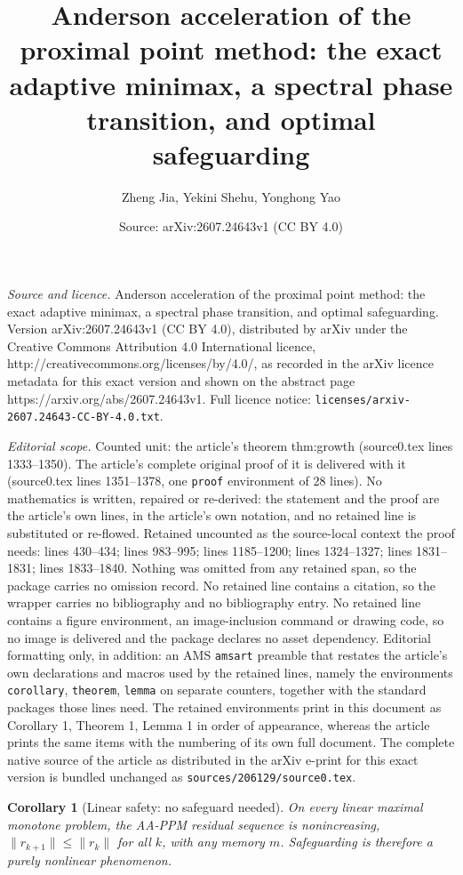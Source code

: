 \documentclass[10pt,a4paper]{amsart}
\title{Anderson acceleration of the proximal point method: the exact adaptive minimax, a spectral phase transition, and optimal safeguarding}
\author{Zheng Jia, Yekini Shehu, Yonghong Yao}
\date{Source: arXiv:2607.24643v1 (CC BY 4.0)}
\newtheorem{corollary}{Corollary}
\newcommand{\norm}[1]{\| #1 \|}
\begin{document}
\maketitle

\noindent\emph{Source and licence.} Anderson acceleration of the proximal point method: the exact adaptive minimax, a spectral phase transition, and optimal safeguarding. Version arXiv:2607.24643v1 (CC BY 4.0), distributed by arXiv under the Creative Commons Attribution 4.0 International licence, http://creativecommons.org/licenses/by/4.0/, as recorded in the arXiv licence metadata for this exact version and shown on the abstract page https://arxiv.org/abs/2607.24643v1. Full licence notice: \texttt{licenses/arxiv-2607.24643-CC-BY-4.0.txt}.\par\smallskip

\noindent\textit{Editorial scope.} Counted unit: the article's theorem thm:growth (source0.tex lines 1333--1350). The article's complete original proof of it is delivered with it (source0.tex lines 1351--1378, one \texttt{proof} environment of 28 lines). No mathematics is written, repaired or re-derived: the statement and the proof are the article's own lines, in the article's own notation, and no retained line is substituted or re-flowed.  Retained uncounted as the source-local context the proof needs: lines 430--434; lines 983--995; lines 1185--1200; lines 1324--1327; lines 1831--1831; lines 1833--1840.  Nothing was omitted from any retained span, so the package carries no omission record.  No retained line contains a citation, so the wrapper carries no bibliography and no bibliography entry.  No retained line contains a figure environment, an image-inclusion command or drawing code, so no image is delivered and the package declares no asset dependency.  Editorial formatting only, in addition: an AMS \texttt{amsart} preamble that restates the article's own declarations and macros used by the retained lines, namely the environments \texttt{corollary}, \texttt{theorem}, \texttt{lemma} on separate counters, together with the standard packages those lines need.  The retained environments print in this document as Corollary 1, Theorem 1, Lemma 1 in order of appearance, whereas the article prints the same items with the numbering of its own full document.  The complete native source of the article as distributed in the arXiv e-print for this exact version is bundled unchanged as \texttt{sources/206129/source0.tex}.
\begin{corollary}[Linear safety: no safeguard needed]\label{cor:linsafe}
On every linear maximal monotone problem, the AA-PPM residual sequence is
nonincreasing, $\norm{r_{k+1}}\le\norm{r_k}$ for all $k$, with any memory
$m$. Safeguarding is therefore a purely \emph{nonlinear} phenomenon.
\end{corollary}
\end{document}
